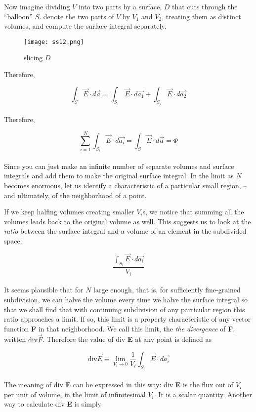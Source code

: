 \documentclass[svgnames]{article}
\begin{document}
Now imagine dividing $V$ into two parts by a surface, $D$ that cuts through the
``balloon'' $S$. denote the two parts of $V$ by $V_1$ and $V_2$, treating them
as distinct volumes, and compute the surface integral separately.


\begin{figure}
  \centering
  \texttt{[image: ss12.png]}
  \caption{slicing $D$} 
\end{figure}


Therefore, 

\[ \int_S \vec{E} \cdot d\vec{a} = \int_{S_1} \vec{E} \cdot d\vec{a_1}
+ \int_{S_2} \vec{E} \cdot d\vec{a_2} \] \\

Therefore, 

\[ \sum_{i=1}^N \int_{S_i} \vec{E} \cdot d\vec{a_i} = \int_S \vec{E} \cdot d\vec{a} = \Phi \] \\ 

Since you can just make an infinite number of separate volumes and surface
integrals and add them to make the original surface integral. In the limit as
$N$ becomes enormous, let us identify a characteristic of a particular small
region, -- and ultimately, of the neighborhood of a point.

If we keep halfing volumes creating smaller $V_i$s, we notice that summing all
the volumes leads back to the original volume as well. This suggests us to look
at the \textit{ratio} between the surface integral and a volume of an element
in the subdivided space:

\[ \frac{\int_{S_i} \vec{E} \cdot d\vec{a_i}}{V_i} \] \\

It seems plausible that for $N$ large enough, that is, for sufficiently
fine-grained subdivision, we can halve the volume every time we halve the
surface integral so that we shall find that with continuing subdivision of any
particular region this ratio approaches a limit. If so, this limit is
a property characteristic of any vector function \textbf{F} in that
neighborhood. We call this limit, the \textit{the divergence} of \textbf{F},
written $\text{div} \vec{F}$. Therefore the value of div \textbf{E} at any
point is defined as

\[ \text{div} \vec{E} \equiv \lim_{V_i \to 0} \frac{1}{V_i} \int_{S_i} \vec{E} \cdot d\vec{a_i} \] \\

The meaning of div \textbf{E} can be expressed in this way: div \textbf{E} is
the flux out of $V_i$ per unit of volume, in the limit of infinitesimal $V_i$.
It is a scalar quantity. Another way to calculate div \textbf{E} is simply
\end{document}

